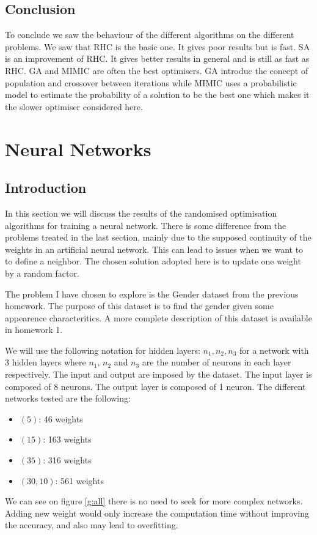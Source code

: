 \documentclass[10pt]{article}
\begin{document}
		\subsection*{Conclusion}
			To conclude we saw the behaviour of the different algorithms on the different problems. We saw that RHC is the basic one. It gives poor results but is fast. SA is an improvement of RHC. It gives better results in general and is still as fast as RHC. GA and MIMIC are often the best optimisers. GA introduc the concept of population and crossover between iterations while MIMIC uses a probabilistic model to estimate the probability of a solution to be the best one which makes it the slower optimiser considered here.
	\section{Neural Networks}
		\subsection*{Introduction}
			In this section we will discuss the results of the randomised optimisation algorithms for training a neural network. There is some difference from the problems treated in the last section, mainly due to the supposed continuity of the weights in an artificial neural network. This can lead to issues when we want to to define a neighbor. The chosen solution adopted here is to update one weight by a random factor.

			The problem I have chosen to explore is the Gender dataset from the previous homework. The purpose of this dataset is to find the gender given some appearence characteritics. A more complete description of this dataset is available in homework 1.

			We will use the following notation for hidden layers: $n_1, n_2, n_3$ for a network with 3 hidden layers where $n_1$, $n_2$ and $n_3$ are the number of neurons in each layer respectively. The input and output are imposed by the dataset. The input layer is composed of 8 neurons. The output layer is composed of 1 neuron. The different networks tested are the following:
			\begin{itemize}
				\item $(5)$: 46 weights
				\item $(15)$: 163 weights
				\item $(35)$: 316 weights
				\item $(30,10)$: 561 weights
			\end{itemize}
			We can see on figure \ref{g:all} there is no need to seek for more complex networks.
			Adding new weight would only increase the computation time without improving the accuracy, and also may lead to overfitting.
\end{document}
